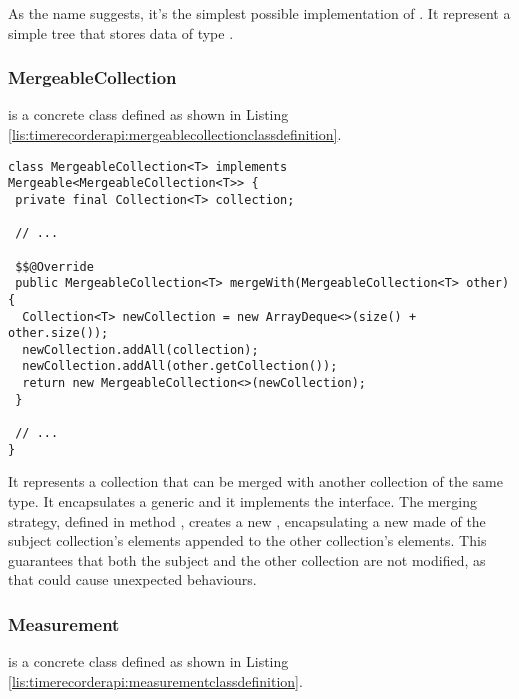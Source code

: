 \noindent As the name suggests, it's the simplest possible implementation of . It represent a simple tree that stores data of type .

\subsubsection{MergeableCollection}

 is a concrete class defined as shown in Listing \ref{lis:timerecorderapi:mergeablecollectionclassdefinition}.

\noindent\begin{minipage}[c]{\linewidth}
\begin{lstlisting}[breaklines,caption={MergeableCollection class definition},label=lis:timerecorderapi:mergeablecollectionclassdefinition]
class MergeableCollection<T> implements Mergeable<MergeableCollection<T>> {
 private final Collection<T> collection;

 // ...

 $$@Override
 public MergeableCollection<T> mergeWith(MergeableCollection<T> other) {
  Collection<T> newCollection = new ArrayDeque<>(size() + other.size());
  newCollection.addAll(collection);
  newCollection.addAll(other.getCollection());
  return new MergeableCollection<>(newCollection);
 }

 // ...
}

\end{lstlisting}
\end{minipage}

\noindent It represents a collection that can be merged with another collection of the same type. It encapsulates a generic  and it implements the  interface. The merging strategy, defined in method , creates a new , encapsulating a new  made of the subject collection's elements appended to the other collection's elements. This guarantees that both the subject and the other collection are not modified, as that could cause unexpected behaviours.

\subsubsection{Measurement}

 is a concrete class defined as shown in Listing \ref{lis:timerecorderapi:measurementclassdefinition}.

